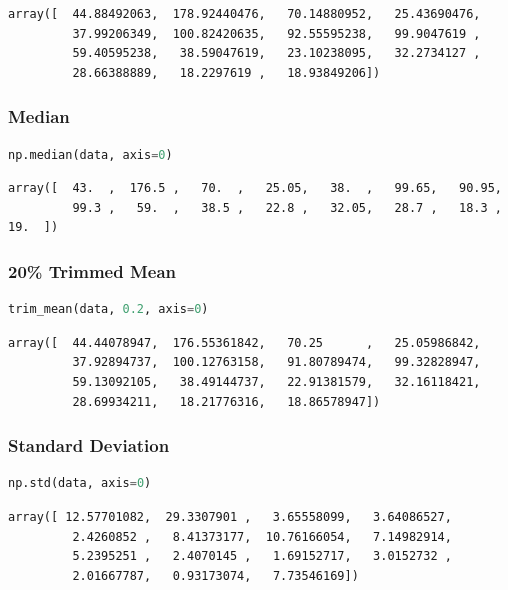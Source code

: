 \begin{lstlisting}
array([  44.88492063,  178.92440476,   70.14880952,   25.43690476,
         37.99206349,  100.82420635,   92.55595238,   99.9047619 ,
         59.40595238,   38.59047619,   23.10238095,   32.2734127 ,
         28.66388889,   18.2297619 ,   18.93849206])
\end{lstlisting}

\hypertarget{median}{%
\subsubsection{Median}\label{median}}

\begin{lstlisting}[language=Python]
np.median(data, axis=0)
\end{lstlisting}

\begin{lstlisting}
array([  43.  ,  176.5 ,   70.  ,   25.05,   38.  ,   99.65,   90.95,
         99.3 ,   59.  ,   38.5 ,   22.8 ,   32.05,   28.7 ,   18.3 ,   19.  ])
\end{lstlisting}

\hypertarget{trimmed-mean}{%
\subsubsection{20\% Trimmed Mean}\label{trimmed-mean}}

\begin{lstlisting}[language=Python]
trim_mean(data, 0.2, axis=0)
\end{lstlisting}

\begin{lstlisting}
array([  44.44078947,  176.55361842,   70.25      ,   25.05986842,
         37.92894737,  100.12763158,   91.80789474,   99.32828947,
         59.13092105,   38.49144737,   22.91381579,   32.16118421,
         28.69934211,   18.21776316,   18.86578947])
\end{lstlisting}

\hypertarget{standard-deviation}{%
\subsubsection{Standard Deviation}\label{standard-deviation}}

\begin{lstlisting}[language=Python]
np.std(data, axis=0)
\end{lstlisting}

\begin{lstlisting}
array([ 12.57701082,  29.3307901 ,   3.65558099,   3.64086527,
         2.4260852 ,   8.41373177,  10.76166054,   7.14982914,
         5.2395251 ,   2.4070145 ,   1.69152717,   3.0152732 ,
         2.01667787,   0.93173074,   7.73546169])
\end{lstlisting}

